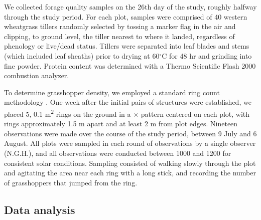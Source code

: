 \documentclass[referee, 
	            sn-basic]
           {sn-jnl}
\begin{document}
\begin{linenumbers}

We collected forage quality samples on the 26th day of the study, roughly halfway through the study period.
For each plot, samples were comprised of 40 western wheatgrass tillers randomly selected by tossing a marker flag in the air and clipping, to ground level, the tiller nearest to where it landed, regardless of phenology or live/dead status. 
Tillers were  separated into leaf blades and stems (which included leaf sheaths) prior to drying at 60$^\circ$C for 48 hr and grinding into fine powder. 
Protein content was determined with a Thermo Scientific Flash 2000 combustion analyzer. 

To determine grasshopper density, we employed a standard ring count methodology
\citep{onsager1977, joern2013}. 
One week after the initial pairs of structures were established, we placed 5, 0.1 m\textsuperscript{2} rings on the ground in a {\large{$\times$}} pattern centered on each plot, with rings approximately 1.5 m apart and at least 2 m from plot edges.
Nineteen observations were made over the course of the study period, between 9 July and 6 August. 
All plots were sampled in each round of observations by a single observer (N.G.H.), and all observations were conducted between 1000 and 1200 for consistent solar conditions. 
Sampling consisted of walking slowly through the plot and agitating the area near each ring with a long stick, and recording the number of grasshoppers that jumped from the ring.

\subsection{Data analysis}


\end{linenumbers}
\end{document}
